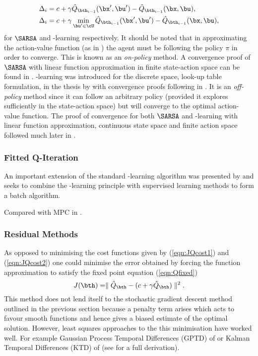 \begin{align}
\Delta_{i} &=  c + \gamma \hat Q_{\bth_{i-1}}(\bx',\bu') - \hat Q_{\bth_{i-1}}(\bx,\bu), \\
\Delta_{i} &=  c + \gamma \min_{\bu' \in \cU}\hat Q_{\bth_{i-1}}(\bx',\bu') - \hat Q_{\bth_{i-1}}(\bx,\bu),
\end{align}
for $\SARSA$ and \Q-learning respectively. It should be noted that in approximating the action-value function (as in \SARSA) the agent must be following the policy $\pi$ in order to converge. This is known as an \textit{on-policy} method. A convergence proof of $\SARSA$ with linear function approximation in finite state-action space can be found in \cite{TV97}. \Q-learning was introduced for the discrete space, look-up table formulation, in the thesis by \cite{Wat89} with convergence proofs following in \cite{WD92}. It is an \textit{off-policy} method since it can follow an arbitrary policy (provided it explores sufficiently in the state-action space) but will converge to the optimal action-value function. The proof of convergence for both $\SARSA$ and \Q-learning with linear function approximation, continuous state space and finite action space followed much later in \cite{MMR09}.

\subsubsection{Fitted Q-Iteration}
An important extension of the standard \Q-learning algorithm was presented by \cite{EGW05} and seeks to combine the \Q-learning principle with supervised learning methods to form a batch algorithm.

Compared with MPC in \cite{EGCW09}.


\subsubsection{Residual Methods}
As opposed to minimising the cost functions given by (\ref{eqn:JQcost1}) and (\ref{eqn:JQcost2}) one could minimise the error obtained by forcing the function approximation to satisfy the fixed point equation (\ref{eqn:Qfixed})
\begin{equation}
J(\bth) = \parallel \hat Q_{\bth} - (c + \gamma \hat Q_{\bth}) \parallel^2.
\end{equation}
This method does not lend itself to the stochastic gradient descent method outlined in the previous section because a penalty term arises which acts to favour smooth functions and hence gives a biased estimate of the optimal solution. However, least squares approaches to the this minimisation have worked well. For example Gaussian Process Temporal Differences (GPTD) of \cite{EMM03,EMM05} or Kalman Temporal Differences (KTD) of \cite{GPF09} (see \cite{GP10a} for a full derivation).



